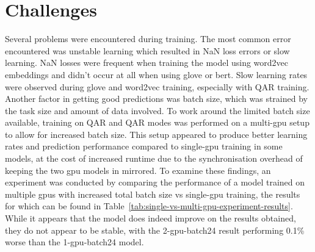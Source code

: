 
\section{Challenges}
\label{sec:experiment-challenges}

Several problems were encountered during training.
The most common error encountered was unstable learning which resulted in NaN loss errors or slow learning.
NaN losses were frequent when training the model using word2vec embeddings and didn't occur at all when using glove or bert.
Slow learning rates were observed during glove and word2vec training, especially with Q\rightarrow{}AR training.
Another factor in getting good predictions was batch size, which was strained by the task size and amount of data involved.
To work around the limited batch size available, training on QA\rightarrow{}R and Q\rightarrow{}AR modes was performed on a multi-\gls{gpu} setup to allow for increased batch size.
This setup appeared to produce better learning rates and prediction performance compared to single-\gls{gpu} training in some models, at the cost of increased runtime due to the synchronisation overhead of keeping the two \gls{gpu} models in mirrored.
To examine these findings, an experiment was conducted by comparing the performance of a model trained on multiple \glspl{gpu} with increased total batch size vs single-\gls{gpu} training, the results for which can be found in Table~\ref{tab:single-vs-multi-gpu-experiment-results}.
While it appears that the model does indeed improve on the results obtained, they do not appear to be stable, with the 2-\gls{gpu}-batch24 result performing 0.1\% worse than the 1-\gls{gpu}-batch24 model.

